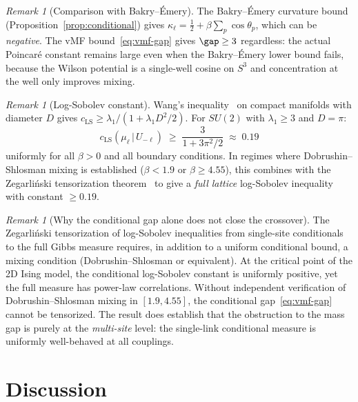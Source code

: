 \documentclass[11pt,a4paper]{article}
\theoremstyle{plain}
\theoremstyle{definition}
\theoremstyle{remark}
\newtheorem{remark}[theorem]{Remark}
\begin{document}
\begin{remark}[Comparison with Bakry--\'Emery]
The Bakry--\'Emery curvature bound
(Proposition~\ref{prop:conditional}) gives $\kappa_\ell
= \frac{1}{2} + \beta\sum_p \cos\theta_p$, which can be
\emph{negative}.  The vMF bound~\eqref{eq:vmf-gap} gives
$\gap \geq 3$ regardless: the actual Poincar\'e constant
remains large even when the Bakry--\'Emery lower bound
fails, because the Wilson potential is a single-well
cosine on $S^3$ and concentration at the well only
improves mixing.
\end{remark}

\begin{remark}[Log-Sobolev constant]
Wang's inequality~\cite{Wang1997} on compact manifolds
with diameter $D$ gives
$c_{\mathrm{LS}} \geq \lambda_1/(1 + \lambda_1 D^2/2)$.
For $SU(2)$ with $\lambda_1 \geq 3$ and $D = \pi$:
\begin{equation}\label{eq:ls-bound}
  c_{\mathrm{LS}}(\mu_\ell \,|\, U_{-\ell})
  \;\geq\; \frac{3}{1 + 3\pi^2/2} \;\approx\; 0.19
\end{equation}
uniformly for all $\beta > 0$ and all boundary conditions.
In regimes where Dobrushin--Shlosman mixing is established
($\beta < 1.9$ or $\beta \geq 4.55$), this combines with the
Zegarli\'nski tensorization theorem~\cite{Zegarlinski1992}
to give a \emph{full lattice} log-Sobolev inequality with
constant $\geq 0.19$.
\end{remark}

\begin{remark}[Why the conditional gap alone does not close
the crossover]
The Zegarli\'nski tensorization of log-Sobolev inequalities
from single-site conditionals to the full Gibbs measure requires,
in addition to a uniform conditional bound, a mixing condition
(Dobrushin--Shlosman or equivalent).  At the critical point of
the 2D Ising model, the conditional log-Sobolev constant is
uniformly positive, yet the full measure has power-law correlations.
Without independent verification of Dobrushin--Shlosman mixing
in $[1.9, 4.55]$, the conditional gap~\eqref{eq:vmf-gap} cannot
be tensorized.  The result does establish that the obstruction to
the mass gap is purely at the \emph{multi-site} level: the
single-link conditional measure is uniformly well-behaved at
all couplings.
\end{remark}


\section{Discussion}\label{sec:discussion}
\end{document}
